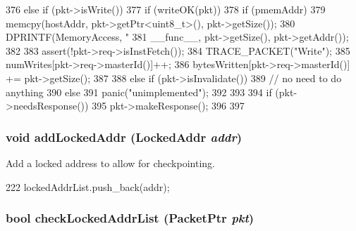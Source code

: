 \begin{DoxyCode}
{{376     } else if (pkt->isWrite()) {
377         if (writeOK(pkt)) {
378             if (pmemAddr) {
379                 memcpy(hostAddr, pkt->getPtr<uint8_t>(), pkt->getSize());
380                 DPRINTF(MemoryAccess, "%
381                         __func__, pkt->getSize(), pkt->getAddr());
382             }
383             assert(!pkt->req->isInstFetch());
384             TRACE_PACKET("Write");
385             numWrites[pkt->req->masterId()]++;
386             bytesWritten[pkt->req->masterId()] += pkt->getSize();
387         }
388     } else if (pkt->isInvalidate()) {
389         // no need to do anything
390     } else {
391         panic("unimplemented");
392     }
393 
394     if (pkt->needsResponse()) {
395         pkt->makeResponse();
396     }
397 }
\end{DoxyCode}
\hypertarget{classAbstractMemory_a41e2bc27bc88cc5c7d1d8c7a905e7cfc}{
\subsubsection[{addLockedAddr}]{\setlength{\rightskip}{0pt plus 5cm}void addLockedAddr ({\bf LockedAddr} {\em addr})}}
\label{classAbstractMemory_a41e2bc27bc88cc5c7d1d8c7a905e7cfc}
Add a locked address to allow for checkpointing. 


\begin{DoxyCode}
222 { lockedAddrList.push_back(addr); }
\end{DoxyCode}
\hypertarget{classAbstractMemory_af088ed7a675d24827a3300bdbc62e96a}{
\subsubsection[{checkLockedAddrList}]{\setlength{\rightskip}{0pt plus 5cm}bool checkLockedAddrList ({\bf PacketPtr} {\em pkt})}}
\label{classAbstractMemory_af088ed7a675d24827a3300bdbc62e96a}



